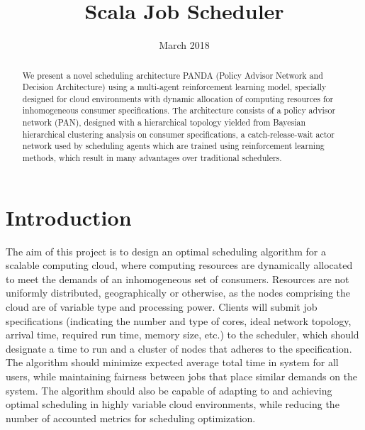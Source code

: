 \documentclass{article}
\title{Scala Job Scheduler}
\date{March 2018}
\theoremstyle{definition}
\theoremstyle{remark}
\begin{document}
	\maketitle

	\begin{abstract}
		We present a novel scheduling architecture PANDA (Policy Advisor Network and Decision Architecture) using a multi-agent reinforcement learning model, specially designed for cloud environments with dynamic allocation of computing resources for inhomogeneous consumer specifications. The architecture consists of a policy advisor network (PAN), designed with a hierarchical topology yielded from Bayesian hierarchical clustering analysis on consumer specifications, a catch-release-wait actor network used by scheduling agents  which are trained using reinforcement learning methods, which result in many advantages over traditional schedulers.
	\end{abstract}

	\newpage


	\section*{Introduction}

	The aim of this project is to design an optimal scheduling algorithm for a scalable computing cloud, where computing resources are dynamically allocated to meet the demands of an inhomogeneous set of consumers. Resources are not uniformly distributed, geographically or otherwise, as the nodes comprising the cloud are of variable type and processing power. Clients will submit job specifications (indicating the number and type of cores, ideal network topology, arrival time, required run time, memory size, etc.) to the scheduler, which should designate a time to run and a cluster of nodes that adheres to the specification. The algorithm should minimize expected average total time in system for all users, while maintaining fairness between jobs that place similar demands on the system. The algorithm should also be capable of adapting to and achieving optimal scheduling in highly variable cloud environments, while reducing the number of accounted metrics for scheduling optimization.
\end{document}
